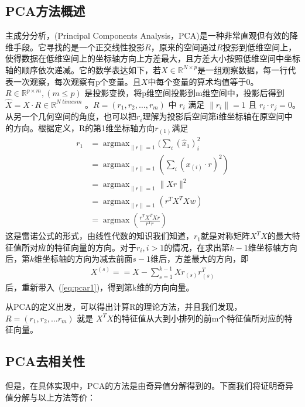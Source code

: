     \subsection{PCA方法概述}
    主成分分析，(Principal Components Analysis，PCA)是一种非常直观但有效的降维手段。它寻找的是一个正交线性投影$R$，原来的空间通过$R$投影到低维空间上，使得数据在低维空间上的坐标轴方向上方差最大，且方差大小按照低维空间中坐标轴的顺序依次递减。它的数学表达如下，若$X \in \mathbb{R}^{N\times p}  $是一组观察数据，每一行代表一次观察，每次观察有p个变量。且$X$中每个变量的算术均值等于0。$R \in \mathbb{R} ^{p \times m}, (m \leqslant p) $ 是投影变换，将p维空间投影到m维空间中，投影后得到$\hat{X} = X\cdot R \in \mathbb{R}^{N \ times m}$ 。$R = (r_1, r_2, \dots, r_m)$ 中 $r_i$ 满足 $ \|r_i\| = 1$ 且 $r_i \cdot r_j = 0$。从另一个几何空间的角度，也可以把$r_i$理解为投影后空间第i维坐标轴在原空间中的方向。根据定义，R的第1维坐标轴方向$r_{(1)}$满足
    \begin{equation}
    \label{eq:pcar1}
    \begin{split}
        r_{1} & = \mathop{\arg\max}_{\|r\|=1} (\sum_i(\hat{x} _1)^2_{i} \\
        & = \mathop{\arg\max}_{\|r\| = 1}(\sum_i(x_{(i)}\cdot r)^2) \\
        & = \mathop{\arg\max} _{\|r\|=1} \|Xr\|^2 \\
        & = \mathop{arg\max}_{\|r\|= 1} (r^TX^TXw) \\
        & = \mathop{\arg\max} (\frac{r^TX^TXr}{r^Tr}) 
    \end{split}
    \end{equation}
    这是雷诺公式\cite{trefethen1997numerical}的形式，由线性代数的知识我们知道，$r_1$就是对称矩阵$X^TX$的最大特征值所对应的特征向量的方向。对于$r_i, i > 1$的情况，在求出第$k-1$维坐标轴方向后，第$k$维坐标轴的方向为减去前面$s-1$维后，方差最大的方向，即
    \begin{equation}
    \begin{split}
        X^{(s)} = = X - \sum^{k - 1}_{s = 1} Xr_{(s)}r_{(s)}^T
    \end{split}    
    \end{equation}
    后，重新带入~(\ref{eq:pcar1})，得到第k维的方向向量。

    从PCA的定义出发，可以得出计算R的理论方法，并且我们发现，$R = (r_1, r_2, \dots r_m)$ 就是 $X^T X$的特征值从大到小排列的前m个特征值所对应的特征向量。

    \subsection{PCA去相关性}
    但是，在具体实现中，PCA的方法是由奇异值分解得到的。下面我们将证明奇异值分解与以上方法等价：
    
